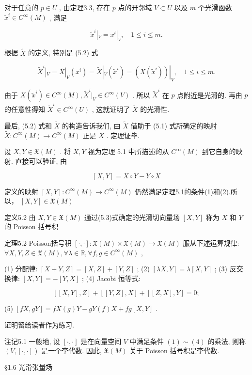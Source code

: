 对于任意的  $p \in U$ , 由定理3.3, 存在  $p$  点的开邻域  $V \subset U$  以及  $m$  个光滑函数  $\tilde{x}^i \in C^\infty(M)$ , 满足

$$
\tilde {x} ^ {i} | _ {V} = x ^ {i} | _ {V}, \quad 1 \leqslant i \leqslant m.
$$

根据  $\tilde{X}$  的定义, 特别是 (5.2) 式

$$
\tilde {X} ^ {i} | _ {V} = \bar {X} | _ {V} \left(x ^ {i}\right) = \tilde {X} | _ {V} \left(\tilde {x} ^ {i}\right) = \left(X \left(\tilde {x} ^ {i}\right)\right) | _ {V}, \quad 1 \leqslant i \leqslant m.
$$

由于  $X(\tilde{x}^i) \in C^\infty(M), \tilde{X}^i|_V \in C^\infty(V)$ . 所以  $\tilde{X}^i$  在  $p$  点附近是光滑的. 再由  $p$  的任意性得知  $\tilde{X}^i \in C^\infty(U)$ , 这就证明了  $\tilde{X}$  的光滑性.

最后, (5.2) 式和  $\tilde{X}$  的构造告诉我们, 由  $\tilde{X}$  借助于 (5.1) 式所确定的映射  $\tilde{X}: C^{\infty}(M) \to C^{\infty}(M)$  正是  $X$ . 定理证毕.

设  $X, Y \in \mathfrak{X}(M)$ . 将  $X, Y$  视为定理 5.1 中所描述的从  $C^\infty(M)$  到它自身的映射. 直接可以验证, 由

$$
[ X, Y ] = X \circ Y - Y \circ X %
$$

定义的映射  $[X,Y]:C^{\infty}(M)\to C^{\infty}(M)$  仍然满足定理5.1的条件(1)和(2).所以，  $[X,Y]\in \mathfrak{X}(M)$

定义5.2 由  $X, Y \in \mathfrak{X}(M)$  通过(5.3)式确定的光滑切向量场  $[X, Y]$  称为  $X$  和  $Y$  的 Poisson 括号积

定理5.2 Poisson括号积  $[\cdot, \cdot]: \mathfrak{X}(M) \times \mathfrak{X}(M) \to \mathfrak{X}(M)$  服从下述运算规律:  $\forall X, Y, Z \in \mathfrak{X}(M), \forall \lambda \in \mathbb{R}, \forall f, g \in C^{\infty}(M)$ ,

(1) 分配律:  $[X + Y, Z] = [X, Z] + [Y, Z]$ ;  
(2)  $[\lambda X, Y] = \lambda [X, Y]$ ;  
(3) 反交换律:  $[X, Y] = -[Y, X]$ ;  
(4) Jacobi 恒等式:

$$
[ [ X, Y ], Z ] + [ [ Y, Z ], X ] + [ [ Z, X ], Y ] = 0;
$$

(5)  $[fX, gY] = fX(g)Y - gY(f)X + fg[X,Y]$ .

证明留给读者作为练习.

注记5.1 一般地, 设  $[\cdot, \cdot]$  是在向量空间  $V$  中满足条件  $(1) \sim (4)$  的乘法, 则称  $(V, [\cdot, \cdot])$  是一个李代数. 因此,  $\mathfrak{X}(M)$  关于 Poisson 括号积是李代数.

 §1.6 光滑张量场

